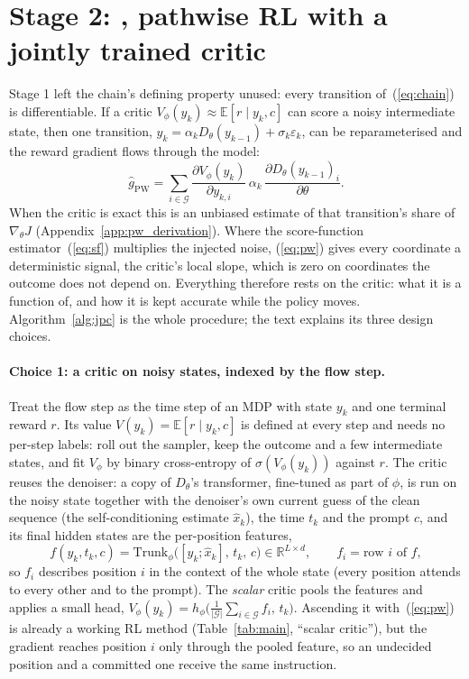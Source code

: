 \section{Stage 2: \jpc{}, pathwise RL with a jointly trained critic}
\label{sec:method}
Stage 1 left the chain's defining property unused: every transition of~(\ref{eq:chain}) is differentiable. If a critic $V_\phi(y_k)\approx\mathbb E[r\mid y_k,c]$ can score a noisy intermediate state, then one transition, $y_k=\alpha_kD_\theta(y_{k-1})+\sigma_k\varepsilon_k$, can be reparameterised and the reward gradient flows through the model:
\begin{equation}
\hat g_{\mathrm{PW}}=\sum_{i\in\mathcal G}\frac{\partial V_\phi(y_k)}{\partial y_{k,i}}\,\alpha_k\,\frac{\partial D_\theta(y_{k-1})_i}{\partial\theta}.
\label{eq:pw}
\end{equation}
When the critic is exact this is an unbiased estimate of that transition's share of $\nabla_\theta J$ (Appendix~\ref{app:pw_derivation}). Where the score-function estimator~(\ref{eq:sf}) multiplies the injected noise, (\ref{eq:pw}) gives every coordinate a deterministic signal, the critic's local slope, which is zero on coordinates the outcome does not depend on. Everything therefore rests on the critic: what it is a function of, and how it is kept accurate while the policy moves. Algorithm~\ref{alg:jpc} is the whole procedure; the text explains its three design choices.

\paragraph{Choice 1: a critic on noisy states, indexed by the flow step.}
Treat the flow step as the time step of an MDP with state $y_k$ and one terminal reward $r$. Its value $V(y_k)=\mathbb E[r\mid y_k,c]$ is defined at every step and needs no per-step labels: roll out the sampler, keep the outcome and a few intermediate states, and fit $V_\phi$ by binary cross-entropy of $\sigma(V_\phi(y_k))$ against $r$. The critic reuses the denoiser: a copy of $D_\theta$'s transformer, fine-tuned as part of $\phi$, is run on the noisy state together with the denoiser's own current guess of the clean sequence (the self-conditioning estimate $\hat x_k$), the time $t_k$ and the prompt $c$, and its final hidden states are the per-position features,
\begin{equation}
f(y_k,t_k,c)=\mathrm{Trunk}_\phi\big([y_k;\hat x_k],\,t_k,\,c\big)\in\mathbb R^{L\times d},\qquad f_i=\text{row }i\text{ of }f,
\label{eq:feat}
\end{equation}
so $f_i$ describes position $i$ in the context of the whole state (every position attends to every other and to the prompt). The \emph{scalar} critic pools the features and applies a small head, $V_\phi(y_k)=h_\phi\big(\tfrac1{|\mathcal G|}\sum_{i\in\mathcal G}f_i,\,t_k\big)$. Ascending it with~(\ref{eq:pw}) is already a working RL method (Table~\ref{tab:main}, ``scalar critic''), but the gradient reaches position $i$ only through the pooled feature, so an undecided position and a committed one receive the same instruction.

